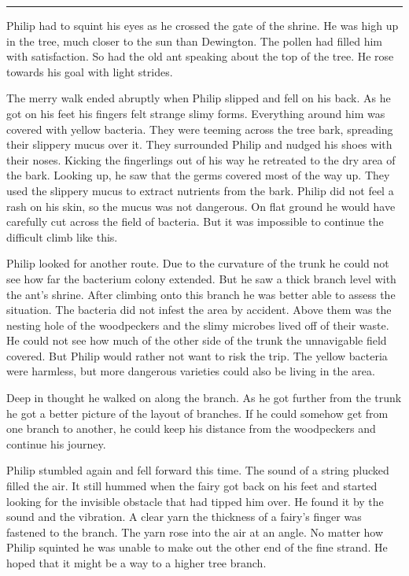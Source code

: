 \documentclass[10pt, draft]{memoir}
\renewcommand{\pfbreakdisplay}{\bigskip \ding{166} \bigskip}
\newcommand{\secbreak}{\fancybreak{\pfbreakdisplay}}
\begin{document}
\secbreak

Philip had to squint his eyes as he crossed the gate of the shrine. He was high up in the tree, much closer to the sun than Dewington. The pollen had filled him with satisfaction. So had the old ant speaking about the top of the tree. He rose towards his goal with light strides.

The merry walk ended abruptly when Philip slipped and fell on his back. As he got on his feet his fingers felt strange slimy forms. Everything around him was covered with yellow bacteria. They were teeming across the tree bark, spreading their slippery mucus over it. They surrounded Philip and nudged his shoes with their noses. Kicking the fingerlings out of his way he retreated to the dry area of the bark. Looking up, he saw that the germs covered most of the way up. They used the slippery mucus to extract nutrients from the bark. Philip did not feel a rash on his skin, so the mucus was not dangerous. On flat ground he would have carefully cut across the field of bacteria. But it was impossible to continue the difficult climb like this.

Philip looked for another route. Due to the curvature of the trunk he could not see how far the bacterium colony extended. But he saw a thick branch level with the ant's shrine. After climbing onto this branch he was better able to assess the situation. The bacteria did not infest the area by accident. Above them was the nesting hole of the woodpeckers and the slimy microbes lived off of their waste. He could not see how much of the other side of the trunk the unnavigable field covered. But Philip would rather not want to risk the trip. The yellow bacteria were harmless, but more dangerous varieties could also be living in the area.

Deep in thought he walked on along the branch. As he got further from the trunk he got a better picture of the layout of branches. If he could somehow get from one branch to another, he could keep his distance from the woodpeckers and continue his journey.

Philip stumbled again and fell forward this time. The sound of a string plucked filled the air. It still hummed when the fairy got back on his feet and started looking for the invisible obstacle that had tipped him over. He found it by the sound and the vibration. A clear yarn the thickness of a fairy's finger was fastened to the branch. The yarn rose into the air at an angle. No matter how Philip squinted he was unable to make out the other end of the fine strand. He hoped that it might be a way to a higher tree branch.
\end{document}
